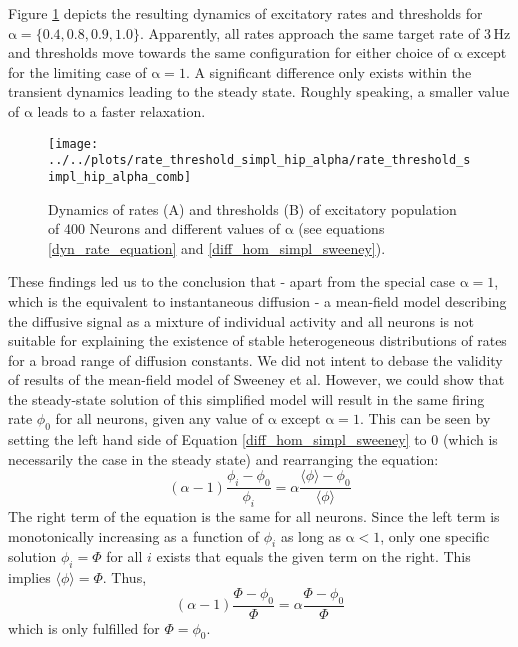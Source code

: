 \documentclass[10pt,a4paper]{article}
\begin{document}
Figure \ref{dynamics_rate_threshold_dyn_mean_field_sweeney} depicts the resulting dynamics of excitatory rates and thresholds for $\mathrm{\alpha=\lbrace 0.4,0.8,0.9,1.0\rbrace}$. Apparently, all rates approach the same target rate of $\mathrm{3\,Hz}$ and thresholds move towards the same configuration for either choice of $\mathrm{\alpha}$ except for the limiting case of $\mathrm{\alpha=1}$. A significant difference only exists within the transient dynamics leading to the steady state. Roughly speaking, a smaller value of $\mathrm{\alpha}$ leads to a faster relaxation.
\begin{figure}
\texttt{[image: ../../plots/rate\_threshold\_simpl\_hip\_alpha/rate\_threshold\_simpl\_hip\_alpha\_comb]}
\caption{Dynamics of rates (A) and thresholds (B) of excitatory population of 400 Neurons and different values of $\mathrm{\alpha}$ (see equations \eqref{dyn_rate_equation} and \eqref{diff_hom_simpl_sweeney}).}
\label{dynamics_rate_threshold_dyn_mean_field_sweeney}
\end{figure}
These findings led us to the conclusion that - apart from the special case $\mathrm{\alpha=1}$, which is the equivalent to instantaneous diffusion - a mean-field model describing the diffusive signal as a mixture of individual activity and all neurons is not suitable for explaining the existence of stable heterogeneous distributions of rates for a broad range of diffusion constants. We did not intent to debase the validity of results of the mean-field model of Sweeney et al. However, we could show that the steady-state solution of this simplified model will result in the same firing rate $\phi_0$ for all neurons, given any value of $\mathrm{\alpha}$ except $\mathrm{\alpha=1}$. This can be seen by setting the left hand side of Equation \eqref{diff_hom_simpl_sweeney} to $0$ (which is necessarily the case in the steady state) and rearranging the equation:
\begin{equation}
(\alpha-1)\frac{\phi_i - \phi_0}{\phi_i} = \alpha \frac{\langle \phi \rangle - \phi_0}{\langle \phi \rangle}
\label{diff_hom_simpl_sweeney_2}
\end{equation}
The right term of the equation is the same for all neurons. Since the left term is monotonically increasing as a function of $\phi_i$ as long as $\mathrm{\alpha<1}$, only one specific solution $\phi_i = \Phi$ for all $i$ exists that equals the given term on the right. This implies $\langle \phi \rangle = \Phi$. Thus,
\begin{equation}
(\alpha-1)\frac{\Phi - \phi_0}{\Phi} = \alpha \frac{\Phi - \phi_0}{\Phi}
\label{diff_hom_simpl_sweeney_3}
\end{equation}
which is only fulfilled for $\Phi = \phi_0$.
\end{document}

